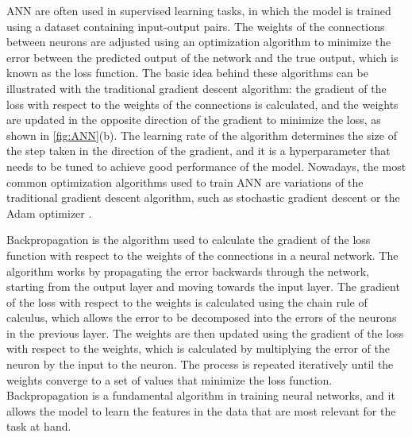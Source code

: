 ANN are often used in supervised learning tasks, in which the model is trained
using a dataset containing input-output pairs. The weights of the connections
between neurons are adjusted using an optimization algorithm to minimize the
error between the predicted output of the network and the true output, which is
known as the loss function. The basic idea behind these algorithms can be
illustrated with the traditional gradient descent algorithm: the gradient of
the loss with respect to the weights of the connections is calculated, and the
weights are updated in the opposite direction of the gradient to minimize the
loss, as shown in \cref{fig:ANN}(b). The learning rate of the algorithm
determines the size of the step taken in the direction of the gradient, and it
is a hyperparameter that needs to be tuned to achieve good performance of the
model. Nowadays, the most common optimization algorithms used to train ANN are
variations of the traditional gradient descent algorithm, such as stochastic
gradient descent or the Adam optimizer \cite{Goodfellow2016}.

Backpropagation is the algorithm used to calculate the gradient of the loss
function with respect to the weights of the connections in a neural network.
The algorithm works by propagating the error backwards through the network,
starting from the output layer and moving towards the input layer. The
gradient of the loss with respect to the weights is calculated using the chain
rule of calculus, which allows the error to be decomposed into the errors of
the neurons in the previous layer. The weights are then updated using the
gradient of the loss with respect to the weights, which is calculated by
multiplying the error of the neuron by the input to the neuron. The process is
repeated iteratively until the weights converge to a set of values that
minimize the loss function. Backpropagation is a fundamental algorithm in
training neural networks, and it allows the model to learn the features in the
data that are most relevant for the task at hand.

